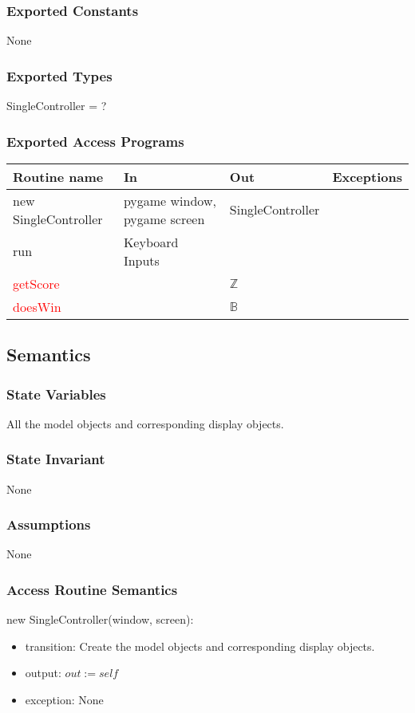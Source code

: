 \documentclass[12pt]{article}
\begin{document}
\subsubsection*{Exported Constants}
None
\subsubsection*{Exported Types}
SingleController = ?
\subsubsection*{Exported Access Programs}
\begin{tabular}{| l | l | l | p{5cm} |}
\hline
\textbf{Routine name} & \textbf{In} & \textbf{Out} & \textbf{Exceptions}\\
\hline
new SingleController & pygame window, pygame screen & SingleController & \\
\hline
run & Keyboard Inputs &  & \\
\hline
\textcolor{red}{getScore} &&$\mathbb{Z}$&\\
\hline
\textcolor{red}{doesWin} &&$\mathbb{B}$&\\
\hline
\end{tabular}

\subsection*{Semantics}
\subsubsection*{State Variables}
All the model objects and corresponding display objects.
\subsubsection*{State Invariant}
None
\subsubsection*{Assumptions}
None
\subsubsection*{Access Routine Semantics}
\noindent new SingleController(window, screen):
\begin{itemize}
\item transition: Create the model objects and corresponding display objects.
\item output: $out := \mathit{self}$
\item exception: None
\end{itemize}
\end{document}
